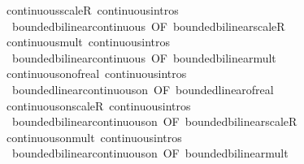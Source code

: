 \begin{isabellebody}
\isanewline
{}\isamarkupfalse%
\ continuous{\isacharunderscore}{\kern0pt}scaleR\ {\isacharbrackleft}{\kern0pt}continuous{\isacharunderscore}{\kern0pt}intros{\isacharbrackright}{\kern0pt}\ {\isacharequal}{\kern0pt}\isanewline
\ \ bounded{\isacharunderscore}{\kern0pt}bilinear{\isachardot}{\kern0pt}continuous\ {\isacharbrackleft}{\kern0pt}OF\ bounded{\isacharunderscore}{\kern0pt}bilinear{\isacharunderscore}{\kern0pt}scaleR{\isacharbrackright}{\kern0pt}\isanewline
\isanewline
{}\isamarkupfalse%
\ continuous{\isacharunderscore}{\kern0pt}mult\ {\isacharbrackleft}{\kern0pt}continuous{\isacharunderscore}{\kern0pt}intros{\isacharbrackright}{\kern0pt}\ {\isacharequal}{\kern0pt}\isanewline
\ \ bounded{\isacharunderscore}{\kern0pt}bilinear{\isachardot}{\kern0pt}continuous\ {\isacharbrackleft}{\kern0pt}OF\ bounded{\isacharunderscore}{\kern0pt}bilinear{\isacharunderscore}{\kern0pt}mult{\isacharbrackright}{\kern0pt}\isanewline
\isanewline
{}\isamarkupfalse%
\ continuous{\isacharunderscore}{\kern0pt}on{\isacharunderscore}{\kern0pt}of{\isacharunderscore}{\kern0pt}real\ {\isacharbrackleft}{\kern0pt}continuous{\isacharunderscore}{\kern0pt}intros{\isacharbrackright}{\kern0pt}\ {\isacharequal}{\kern0pt}\isanewline
\ \ bounded{\isacharunderscore}{\kern0pt}linear{\isachardot}{\kern0pt}continuous{\isacharunderscore}{\kern0pt}on\ {\isacharbrackleft}{\kern0pt}OF\ bounded{\isacharunderscore}{\kern0pt}linear{\isacharunderscore}{\kern0pt}of{\isacharunderscore}{\kern0pt}real{\isacharbrackright}{\kern0pt}\isanewline
\isanewline
{}\isamarkupfalse%
\ continuous{\isacharunderscore}{\kern0pt}on{\isacharunderscore}{\kern0pt}scaleR\ {\isacharbrackleft}{\kern0pt}continuous{\isacharunderscore}{\kern0pt}intros{\isacharbrackright}{\kern0pt}\ {\isacharequal}{\kern0pt}\isanewline
\ \ bounded{\isacharunderscore}{\kern0pt}bilinear{\isachardot}{\kern0pt}continuous{\isacharunderscore}{\kern0pt}on\ {\isacharbrackleft}{\kern0pt}OF\ bounded{\isacharunderscore}{\kern0pt}bilinear{\isacharunderscore}{\kern0pt}scaleR{\isacharbrackright}{\kern0pt}\isanewline
\isanewline
{}\isamarkupfalse%
\ continuous{\isacharunderscore}{\kern0pt}on{\isacharunderscore}{\kern0pt}mult\ {\isacharbrackleft}{\kern0pt}continuous{\isacharunderscore}{\kern0pt}intros{\isacharbrackright}{\kern0pt}\ {\isacharequal}{\kern0pt}\isanewline
\ \ bounded{\isacharunderscore}{\kern0pt}bilinear{\isachardot}{\kern0pt}continuous{\isacharunderscore}{\kern0pt}on\ {\isacharbrackleft}{\kern0pt}OF\ bounded{\isacharunderscore}{\kern0pt}bilinear{\isacharunderscore}{\kern0pt}mult{\isacharbrackright}{\kern0pt}\isanewline

\end{isabellebody}
